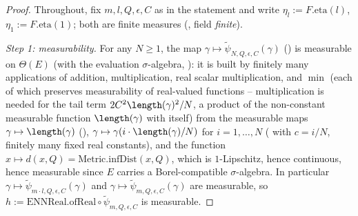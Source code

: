 \begin{proof}
  Throughout, fix $m,l,Q,\epsilon,C$ as in the statement and write $\eta_l := F.\mathrm{eta}(l)$,
  $\eta_1 := F.\mathrm{eta}(1)$; both are finite measures (, field
  \emph{finite}).

  \emph{Step 1: measurability.} For any $N \ge 1$, the map $\gamma \mapsto
  \tilde\psi_{N,Q,\epsilon,C}(\gamma)$ () is measurable on $\Theta(E)$ (with the
  evaluation $\sigma$-algebra, ): it is built by finitely many
  applications of addition, multiplication, real scalar multiplication, and $\min$ (each of which
  preserves measurability of real-valued functions -- multiplication is needed for the tail term
  $2C^2\length(\gamma)^2/N$, a product of the non-constant measurable function $\length(\gamma)$
  with itself) from the measurable maps $\gamma \mapsto
  \length(\gamma)$ (), $\gamma \mapsto \gamma(i\cdot\length(\gamma)/N)$
  for $i=1,\dotsc,N$ ( with $c=i/N$, finitely many fixed real
  constants), and the function $x \mapsto d(x,Q) = \mathrm{Metric.infDist}(x,Q)$, which is
  $1$-Lipschitz, hence continuous, hence measurable since $E$ carries a Borel-compatible
  $\sigma$-algebra. In particular $\gamma \mapsto \tilde\psi_{m\cdot l,Q,\epsilon,C}(\gamma)$ and
  $\gamma \mapsto \tilde\psi_{m,Q,\epsilon,C}(\gamma)$ are measurable, so $h :=
  \mathrm{ENNReal.ofReal} \circ \tilde\psi_{m,Q,\epsilon,C}$ is measurable.


\end{proof}
